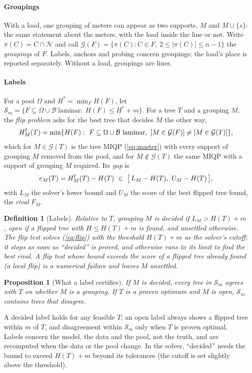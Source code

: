 \documentclass[journal,onecolumn,11pt]{IEEEtran}
\newtheorem{proposition}{Proposition}
\newtheorem{definition}{Definition}
\newcommand{\Nset}{\mathcal{N}}
\newcommand{\Bset}{\mathcal{B}}
\newcommand{\Sset}{\mathcal{S}}
\newcommand{\Gset}{\mathcal{G}}
\begin{document}
\paragraph*{Groupings} With a load, one grouping of meters can appear as two supports, $M$ and $M\cup\{s\}$: the same
statement about the meters, with the load inside the line or not. Write $\pi(C)=C\cap\Nset$ and call
$\Gset(F)=\{\pi(C):C\in F,\ 2\le|\pi(C)|\le n-1\}$ the \emph{groupings} of $F$. Labels, anchors and probing concern
groupings; the load's place is reported separately. Without a load, groupings are lines.

\paragraph*{Labels} For a pool $\Omega$ and $H^*=\min_FH(F)$, let
$\Sset_m=\{F\subseteq\Omega\cup\Bset\ \text{laminar}:\ H(F)\le H^*+m\}$. For a tree $T$ and a grouping $M$, the \emph{flip
problem} asks for the best tree that decides $M$ the other way,
\begin{equation}\label{eq:flip}
H^{\rm f}_M(T)=\min\{H(F):\ F\subseteq\Omega\cup\Bset\ \text{laminar},\ [M\in\Gset(F)]\neq[M\in\Gset(T)]\},
\end{equation}
which for $M\in\Gset(T)$ is the tree MIQP (\ref{eq:master}) with every support of grouping $M$ removed from the pool, and
for $M\notin\Gset(T)$ the same MIQP with a support of grouping $M$ required. Its
\emph{gap} is
\begin{equation}\label{eq:gap}
e_M(T)=H^{\rm f}_M(T)-H(T)\ \in\ \big[\,L_M-H(T),\ U_M-H(T)\,\big],
\end{equation}
with $L_M$ the solver's lower bound and $U_M$ the score of the best flipped tree found, the \emph{rival} $F_M$.
\begin{definition}[Labels]
Relative to $T$, grouping $M$ is \emph{decided} if $L_M>H(T)+m$, \emph{open} if a flipped tree with $H\le H(T)+m$ is found,
and \emph{unsettled} otherwise. The \emph{flip test} solves (\ref{eq:flip}) with the threshold $H(T)+m$ as the solver's
cutoff; it stops as soon as ``decided'' is proved, and otherwise runs to its limit to find the best rival. A flip test whose bound exceeds the score of a flipped tree already found (a local flip) is a numerical failure and leaves $M$ unsettled.
\end{definition}
\begin{proposition}[What a label certifies]\label{prop:label}
If $M$ is decided, every tree in $\Sset_m$ agrees with $T$ on whether $M$ is a grouping. If $T$ is a proven optimum and $M$
is open, $\Sset_m$ contains trees that disagree.
\end{proposition}
A decided label holds for any feasible $T$; an open label always shows a flipped tree within $m$ of $T$, and disagreement
within $\Sset_m$ only when $T$ is proven optimal. Labels concern the model, the data and the pool, not the truth, and are
recomputed when the data or the pool change. In the solver, ``decided'' needs the bound to exceed $H(T)+m$ beyond its
tolerances (the cutoff is set slightly above the threshold).
\end{document}
